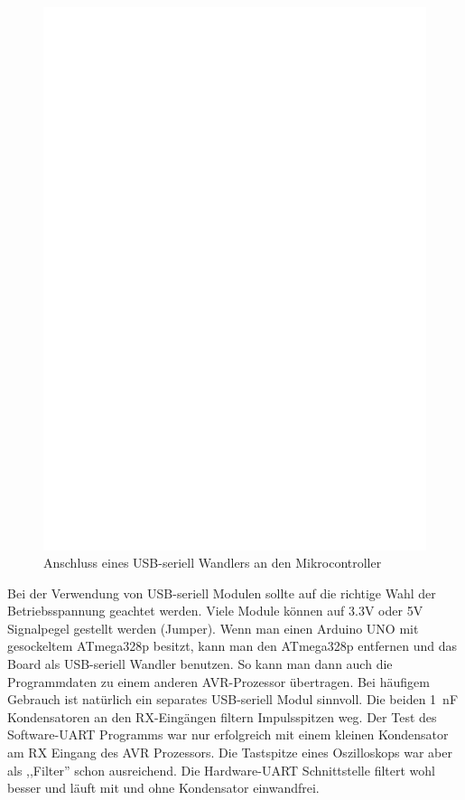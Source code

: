 \begin{figure}[H]
\centering
\includegraphics[width=12cm]{../FIG/UM232.eps}
\caption{Anschluss eines USB-seriell Wandlers an den Mikrocontroller}
\label{fig:UM232}
\end{figure}

Bei der Verwendung von USB-seriell Modulen sollte auf die richtige Wahl der Betriebsspannung
geachtet werden. Viele Module können auf 3.3V oder 5V Signalpegel gestellt werden (Jumper).
Wenn man einen Arduino UNO mit gesockeltem ATmega328p besitzt, kann man den ATmega328p 
entfernen und das Board als USB-seriell Wandler benutzen. 
So kann man dann auch die Programmdaten zu einem anderen AVR-Prozessor übertragen.
Bei häufigem Gebrauch ist natürlich ein separates USB-seriell Modul sinnvoll.
Die beiden 1~nF Kondensatoren an den RX-Eingängen filtern Impulsspitzen weg. Der Test
des Software-UART Programms war nur erfolgreich mit einem kleinen Kondensator am RX Eingang
des AVR Prozessors. Die Tastspitze eines Oszilloskops war aber als ,,Filter'' schon ausreichend.
Die Hardware-UART Schnittstelle filtert wohl besser und läuft mit und ohne Kondensator einwandfrei.

